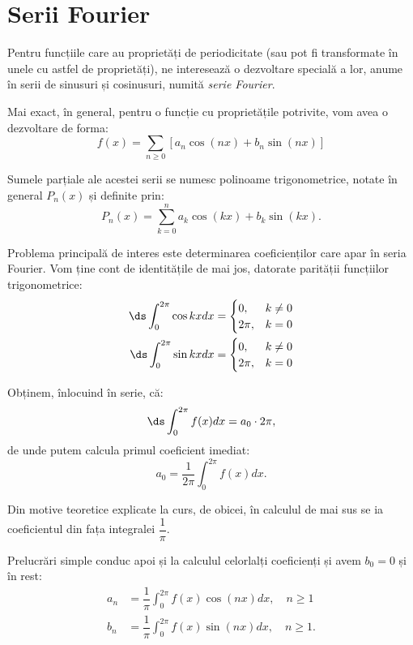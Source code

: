 
\chapter{Serii Fourier}

Pentru funcțiile care au proprietăți de periodicitate (sau pot fi transformate
în unele cu astfel de proprietăți), ne interesează o dezvoltare specială a lor,
anume în serii de sinusuri și cosinusuri, numită \emph{serie Fourier}.

Mai exact, în general, pentru o funcție cu proprietățile potrivite, vom avea
o dezvoltare de forma:
\[
    f(x) = \sum_{n \geq 0} \left[ a_n \cos(nx) + b_n \sin(nx) \right]
\]

Sumele parțiale ale acestei serii se numesc polinoame trigonometrice,
notate în general $ P_n(x) $ și definite prin:
\[
    P_n(x) = \sum_{k = 0}^n a_k \cos(kx) + b_k \sin(kx).
\]

Problema principală de interes este determinarea coeficienților
care apar în seria Fourier. Vom ține cont de identitățile de mai jos,
datorate parității funcțiilor trigonometrice:
\begin{align*}
    \ds\int_0^{2\pi} \cos kx dx &= \begin{cases} 0, & k \neq 0 \\ 2 \pi, & k = 0 \end{cases} \\
    \ds\int_0^{2\pi} \sin kx dx &= \begin{cases} 0, & k \neq 0 \\ 2 \pi, & k = 0 \end{cases}
\end{align*}

Obținem, înlocuind în serie, că:
\[
    \ds\int_0^{2\pi} f(x) dx = a_0 \cdot 2\pi,
\]
de unde putem calcula primul coeficient imediat:
\[
    a_0 = \dfrac{1}{2 \pi} \int_0^{2\pi} f(x) dx.
\]

Din motive teoretice explicate la curs, de obicei, în calculul de mai sus se ia
coeficientul din fața integralei $ \dfrac{1}{\pi} $.

Prelucrări simple conduc apoi și la calculul celorlalți coeficienți
și avem $ b_0 = 0 $ și în rest:
\begin{align*}
    a_n &= \dfrac{1}{\pi} \int_0^{2\pi} f(x) \cos (nx) dx, \quad n \geq 1 \\
    b_n &= \dfrac{1}{\pi} \int_0^{2\pi} f(x) \sin (nx) dx, \quad n \geq 1.
\end{align*}

